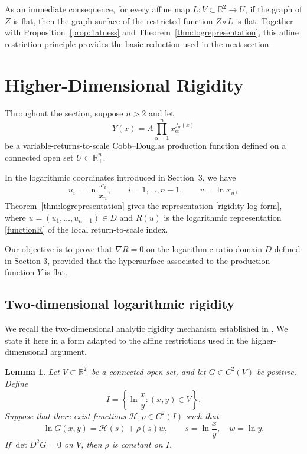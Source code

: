 \documentclass[12pt]{amsart}
\newtheorem{lemma}{Lemma}[section]
\begin{document}
As an immediate consequence, for every affine map $L:V\subset\mathbb R^2\to U$, if the graph of $Z$ is flat, then the graph surface of the restricted function $Z\circ L$ is flat.
Together with Proposition~\ref{prop:flatness} and
Theorem~\ref{thm:logrepresentation}, this affine restriction principle
provides the basic reduction used in the next section.






\section{Higher-Dimensional Rigidity}\label{S5}
\label{sec:rigidity}

Throughout the section, suppose
\(
n>2
\)
and let
\[
Y(x)
=
A\prod_{\alpha=1}^{n}
x_\alpha^{f_\alpha(x)}
\]
be a variable-returns-to-scale Cobb--Douglas production function defined
on a connected open set
\(
U\subset\mathbb R_+^n.
\)

In the logarithmic coordinates introduced in Section~3, we have
\[
u_i=\ln\frac{x_i}{x_n},
\qquad
i=1,\ldots,n-1,
\qquad
v=\ln x_n,
\]
Theorem~\ref{thm:logrepresentation} gives the representation
\eqref{rigidity-log-form},
where
\(
u=(u_1,\ldots,u_{n-1})\in D
\)
and
\(
R(u)
\)
is the logarithmic representation \eqref{functionR} of the local return-to-scale index.

Our objective is to prove that
\(
\nabla R=0
\)
on the logarithmic ratio domain \(D\) defined in Section 3, provided that the hypersurface associated to the production function $Y$ is flat.




\subsection{Two-dimensional logarithmic rigidity}\label{S5.1}

We recall the two-dimensional analytic rigidity mechanism established
in \cite{Previous2D}. We state it here in a form adapted to the affine
restrictions used in the higher-dimensional argument.

\begin{lemma}
\label{lem:2d-log-rigidity}
Let
\(
V\subset\mathbb R_+^2
\)
be a connected open set, and let
\(
G\in C^2(V)
\)
be positive. Define
\[
I
=
\left\{
\ln\frac{x}{y}:(x,y)\in V
\right\}.
\]
Suppose that there exist functions
\(
\mathcal H,\rho\in C^2(I)
\)
such that
\[
\ln G(x,y)
=
\mathcal H(s)+\rho(s)w,
\qquad
s=\ln\frac{x}{y},
\quad
w=\ln y.
\]
If
\(
\det D^2G=0
\)
on $V$, then $\rho$ is constant on $I$.
\end{lemma}
\end{document}
